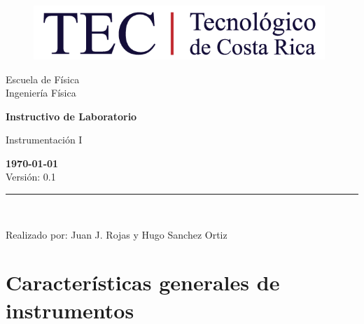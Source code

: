 \documentclass[12pt,letterpaper]{report}
\begin{document}
\begin{titlepage}
    \begin{center}
\vspace*{1in}
\begin{figure}[htb]
\begin{center}
\includegraphics[width=11cm]{fig/logo.png}
\end{center}
\end{figure}
\vspace*{0.4in}
\begin{Large}
Escuela de Física\\
\vspace*{0.15in}
Ingeniería Física\\
\vspace*{0.8in}
\end{Large}
\vspace*{0.2in}
\begin{Large}
\textbf{Instructivo de Laboratorio} \\
\end{Large}
\vspace*{0.3in}
\begin{large}
Instrumentación I\\
\end{large}
\vspace*{2.5in}
\begin{Large}
\textbf{\today}\\
Versión: 0.1\\
\end{Large}
\rule{80mm}{0.1mm}\\
\vspace*{0.1in}
\begin{large}
Realizado por: Juan J. Rojas y Hugo Sanchez Ortiz\\
\end{large}
\end{center}
\end{titlepage}
\tableofcontents
\chapter{Características generales de instrumentos}
\end{document}
